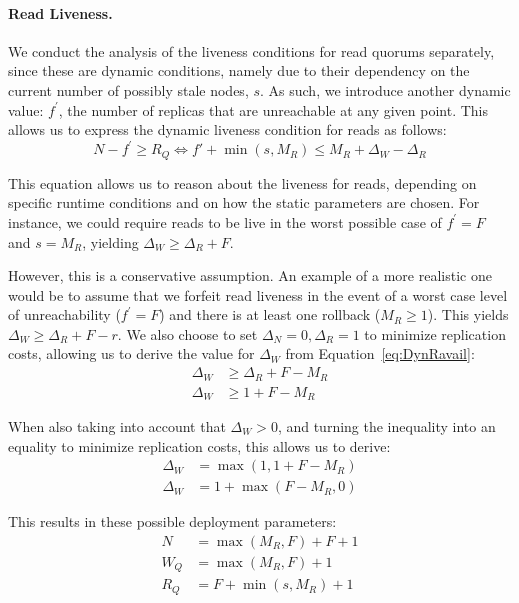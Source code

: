 \paragraph{Read Liveness.}
We conduct the analysis of the liveness conditions for read
quorums separately, since these are dynamic conditions, namely
due to their dependency on the current number of possibly stale
nodes, $s$.  As such, we introduce another dynamic value: $f^{\prime}$,
the number of replicas that are unreachable at any given point.
This allows us to express the dynamic liveness condition for
reads as follows:
\begin{equation}\label{eq:DynRavail}
    N - f^{\prime} \geq R_Q  \Leftrightarrow f' + \min(s, M_R) \leq M_R + \Delta_W - \Delta_R
\end{equation}

This equation allows us to reason about the liveness for reads,
depending on specific runtime conditions and on how the static
parameters are chosen. For instance, we could require reads to be
live in the worst possible case of $f^{\prime} = F$ and $s = M_R$, yielding
$\Delta_W \geq \Delta_R + F$.

However, this is a conservative assumption. An example of a more
realistic one would be to assume that we forfeit read liveness in
the event of a worst case level of unreachability ($f^{\prime} = F$) and
there is at least one rollback ($M_R \geq 1$). This yields
$\Delta_W \geq \Delta_R + F - r$. We also choose to set
$\Delta_N=0,\Delta_R=1$ to minimize replication costs, allowing
us to derive the value for $\Delta_W$ from
Equation~\ref{eq:DynRavail}:
\begin{align} \label{eq:deployment1}
  \Delta_W &\geq  \Delta_R + F - M_R\\
  \Delta_W &\geq  1 + F - M_R
\end{align}

When also taking into account that $\Delta_W > 0$, and turning
the inequality into an equality to minimize replication costs,
this allows us to derive:
\begin{align} \label{eq:deployment2}
  \Delta_W &=  \max(1,1 + F - M_R)\\
  \Delta_W &=  1 + \max(F - M_R,0)
\end{align}

This results in these possible deployment parameters:
\begin{align} \label{eq:deploymentfinal}
    N &= \max(M_R, F) + F + 1  \\
    W_Q &= \max(M_R, F) + 1 \\
    R_Q &= F + \min(s, M_R) + 1 \label{eq:proof3}
\end{align}

